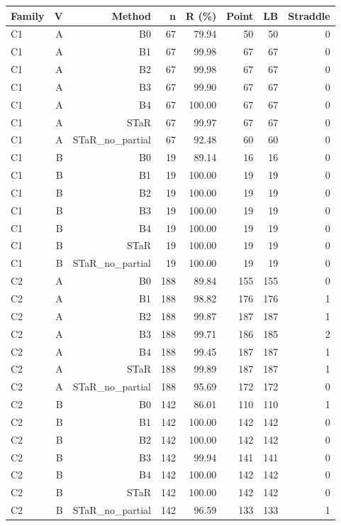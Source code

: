 \begingroup
\small
\setlength{\tabcolsep}{3pt}
\begin{longtable}{@{}lrrrrrrr@{}}
\toprule
Family & V & Method & n & R (\%) & Point & LB & Straddle \\
\midrule
\endhead
C1 & A & B0 & 67 & 79.94 & 50 & 50 & 0 \\
C1 & A & B1 & 67 & 99.98 & 67 & 67 & 0 \\
C1 & A & B2 & 67 & 99.98 & 67 & 67 & 0 \\
C1 & A & B3 & 67 & 99.90 & 67 & 67 & 0 \\
C1 & A & B4 & 67 & 100.00 & 67 & 67 & 0 \\
C1 & A & STaR & 67 & 99.97 & 67 & 67 & 0 \\
C1 & A & STaR\_no\_partial & 67 & 92.48 & 60 & 60 & 0 \\
C1 & B & B0 & 19 & 89.14 & 16 & 16 & 0 \\
C1 & B & B1 & 19 & 100.00 & 19 & 19 & 0 \\
C1 & B & B2 & 19 & 100.00 & 19 & 19 & 0 \\
C1 & B & B3 & 19 & 100.00 & 19 & 19 & 0 \\
C1 & B & B4 & 19 & 100.00 & 19 & 19 & 0 \\
C1 & B & STaR & 19 & 100.00 & 19 & 19 & 0 \\
C1 & B & STaR\_no\_partial & 19 & 100.00 & 19 & 19 & 0 \\
C2 & A & B0 & 188 & 89.84 & 155 & 155 & 0 \\
C2 & A & B1 & 188 & 98.82 & 176 & 176 & 1 \\
C2 & A & B2 & 188 & 99.87 & 187 & 187 & 1 \\
C2 & A & B3 & 188 & 99.71 & 186 & 185 & 2 \\
C2 & A & B4 & 188 & 99.45 & 187 & 187 & 1 \\
C2 & A & STaR & 188 & 99.89 & 187 & 187 & 1 \\
C2 & A & STaR\_no\_partial & 188 & 95.69 & 172 & 172 & 0 \\
C2 & B & B0 & 142 & 86.01 & 110 & 110 & 1 \\
C2 & B & B1 & 142 & 100.00 & 142 & 142 & 0 \\
C2 & B & B2 & 142 & 100.00 & 142 & 142 & 0 \\
C2 & B & B3 & 142 & 99.94 & 141 & 141 & 0 \\
C2 & B & B4 & 142 & 100.00 & 142 & 142 & 0 \\
C2 & B & STaR & 142 & 100.00 & 142 & 142 & 0 \\
C2 & B & STaR\_no\_partial & 142 & 96.59 & 133 & 133 & 1 \\

\end{longtable}
